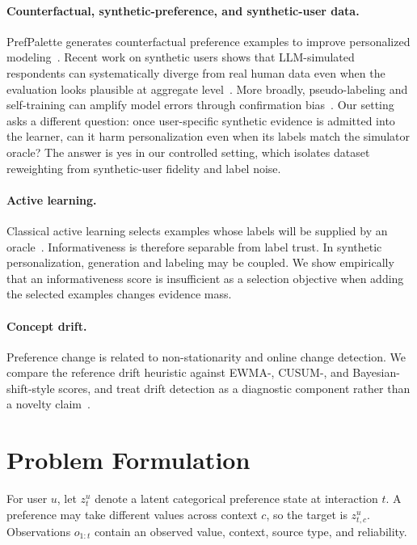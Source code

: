 \documentclass[10pt,twocolumn]{article}
\begin{document}
\paragraph{Counterfactual, synthetic-preference, and synthetic-user data.}
PrefPalette generates counterfactual preference examples to improve personalized modeling~\cite{prefpalette}. Recent work on synthetic users shows that LLM-simulated respondents can systematically diverge from real human data even when the evaluation looks plausible at aggregate level~\cite{syntheticusersfail}. More broadly, pseudo-labeling and self-training can amplify model errors through confirmation bias~\cite{arazo}. Our setting asks a different question: once user-specific synthetic evidence is admitted into the learner, can it harm personalization even when its labels match the simulator oracle? The answer is yes in our controlled setting, which isolates dataset reweighting from synthetic-user fidelity and label noise.

\paragraph{Active learning.}
Classical active learning selects examples whose labels will be supplied by an oracle~\cite{settles}. Informativeness is therefore separable from label trust. In synthetic personalization, generation and labeling may be coupled. We show empirically that an informativeness score is insufficient as a selection objective when adding the selected examples changes evidence mass.

\paragraph{Concept drift.}
Preference change is related to non-stationarity and online change detection. We compare the reference drift heuristic against EWMA-, CUSUM-, and Bayesian-shift-style scores, and treat drift detection as a diagnostic component rather than a novelty claim~\cite{adams}.

\section{Problem Formulation}
For user $u$, let $z_t^u$ denote a latent categorical preference state at interaction $t$. A preference may take different values across context $c$, so the target is $z_{t,c}^u$. Observations $o_{1:t}$ contain an observed value, context, source type, and reliability.
\end{document}
